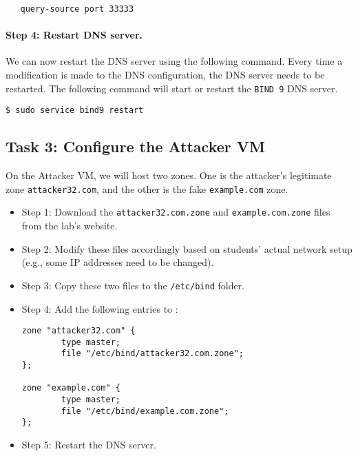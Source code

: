 \begin{itemize}
\begin{lstlisting}
   query-source port 33333
\end{lstlisting}

\end{itemize}



\paragraph{Step 4: Restart DNS server.}
We can now restart the DNS server using the following command. Every time
a modification is made to the DNS configuration, the DNS server needs to be
restarted. The following command will start or restart the \texttt{BIND 9}
DNS server.

\begin{lstlisting}
$ sudo service bind9 restart
\end{lstlisting}




\subsection{Task 3: Configure the Attacker VM}

On the Attacker VM, we will host two zones. One is 
the attacker's legitimate zone \texttt{attacker32.com}, and the other 
is the fake \texttt{example.com} zone.  


\begin{itemize} 
\item Step 1: Download the \texttt{attacker32.com.zone} and 
              \texttt{example.com.zone} files from the lab's website. 

\item Step 2: Modify these files accordingly based on students'
              actual network setup (e.g., some IP addresses need to be
	      changed). 

\item Step 3: Copy these two files to the \texttt{/etc/bind} folder. 

\item Step 4: Add the following entries to :


\begin{lstlisting}
zone "attacker32.com" {
        type master;
        file "/etc/bind/attacker32.com.zone";
};

zone "example.com" {
        type master;
        file "/etc/bind/example.com.zone";
};
\end{lstlisting}


\item Step 5: Restart the DNS server.
\end{itemize} 
 


